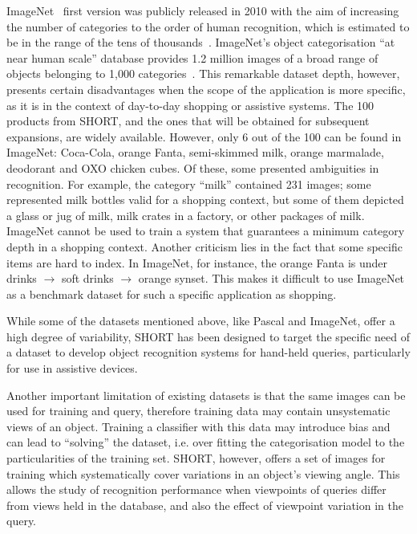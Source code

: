 ImageNet~\cite{Deng2009} first version was publicly released in 2010 with the aim of increasing the number of categories to the order of human recognition, which is estimated to be in the range of the tens of thousands~\cite{Biederman1987}. ImageNet's object categorisation ``at near human scale'' database provides 1.2 million images of a broad range of objects belonging to 1,000 categories~\cite{Feifei2007}. This remarkable dataset depth, however, presents certain disadvantages when the scope of the application is more specific, as it is in the context of day-to-day shopping or assistive systems. The 100 products from SHORT, and the ones that will be obtained for subsequent expansions, are widely available. However, only 6 out of the 100 can be found in ImageNet: Coca-Cola, orange Fanta, semi-skimmed milk, orange marmalade, deodorant and OXO chicken cubes. Of these, some presented ambiguities in recognition. For example, the category ``milk'' contained 231 images; some represented milk bottles valid for a shopping context, but some of them depicted a glass or jug of milk, milk crates in a factory, or other packages of milk. ImageNet cannot be used to train a system that guarantees a minimum category depth in a shopping context. Another criticism lies in the fact that some specific items are hard to index. In ImageNet, for instance, the orange Fanta is under drinks $\rightarrow$ soft drinks $\rightarrow$ orange synset. This makes it difficult to use ImageNet as a benchmark dataset for such a specific application as shopping.


While some of the datasets mentioned above, like Pascal and ImageNet, offer a high degree of variability, SHORT has been designed to target the specific need of a dataset to develop object recognition systems for hand-held queries, particularly for use in assistive devices.

Another important limitation of existing datasets is that the same images can be used for training and query, therefore training data may contain unsystematic views of an object. Training a classifier with this data may introduce bias and can lead to ``solving'' the dataset, i.e. over fitting the categorisation model to the particularities of the training set. SHORT, however, offers a set of images for training which systematically cover variations in an object's viewing angle. This allows the study of recognition performance when viewpoints of queries differ from views held in the database, and also the effect of viewpoint variation in the query.


